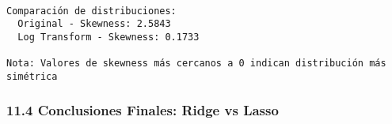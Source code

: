 \documentclass[11pt]{article}
\begin{document}
    \begin{center}
    \end{center}
    { \hspace*{\fill} \\}
    
    \begin{Verbatim}[commandchars=\\\{\}]
Comparación de distribuciones:
  Original - Skewness: 2.5843
  Log Transform - Skewness: 0.1733

Nota: Valores de skewness más cercanos a 0 indican distribución más simétrica
    \end{Verbatim}

    \subsubsection{11.4 Conclusiones Finales: Ridge vs
Lasso}\label{conclusiones-finales-ridge-vs-lasso}
\end{document}
